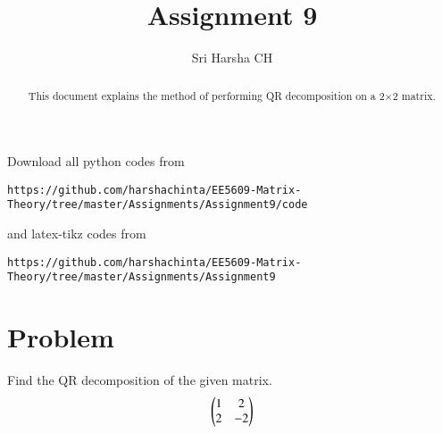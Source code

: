 \documentclass[journal,12pt,twocolumn]{IEEEtran}
\begin{document}
\renewcommand{\thefigure}{\theproblem}

\def\putbox#1#2#3{\makebox[0in][l]{\makebox[#1][l]{}\raisebox{\baselineskip}[0in][0in]{\raisebox{#2}[0in][0in]{#3}}}}
     \def\rightbox#1{\makebox[0in][r]{#1}}
     \def\centbox#1{\makebox[0in]{#1}}
     \def\topbox#1{\raisebox{-\baselineskip}[0in][0in]{#1}}
     \def\midbox#1{\raisebox{-0.5\baselineskip}[0in][0in]{#1}}
\vspace{3cm}
\title{Assignment 9}
\author{Sri Harsha CH}

\maketitle
\newpage

\bigskip
\renewcommand{\thefigure}{\theenumi}
\renewcommand{\thetable}{\theenumi}

\begin{abstract}
This document explains the method of performing QR decomposition on a 2$\times$2 matrix.
\end{abstract}

Download all python codes from 
\begin{lstlisting}
https://github.com/harshachinta/EE5609-Matrix-Theory/tree/master/Assignments/Assignment9/code
\end{lstlisting}
%
and latex-tikz codes from 
%
\begin{lstlisting}
https://github.com/harshachinta/EE5609-Matrix-Theory/tree/master/Assignments/Assignment9
\end{lstlisting}
%
\section{Problem}
Find the QR decomposition of the given matrix.
\begin{align}
    \begin{pmatrix}1&2\\2&-2\end{pmatrix}
\end{align}
\end{document}
